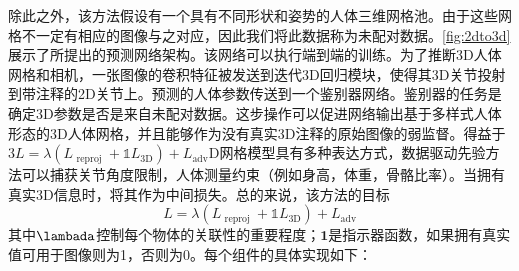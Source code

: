 除此之外，该方法假设有一个具有不同形状和姿势的人体三维网格池。由于这些网格不一定有相应的图像与之对应，因此我们将此数据称为未配对数据。\cref{fig:2dto3d}展示了所提出的预测网络架构。该网络可以执行端到端的训练。为了推断3D人体网格和相机，一张图像的卷积特征被发送到迭代3D回归模块，使得其3D关节投射到带注释的2D关节上。预测的人体参数传送到一个鉴别器网络。鉴别器的任务是确定3D参数是否是来自未配对数据。这步操作可以促进网络输出基于多样式人体形态的3D人体网格，并且能够作为没有真实3D注释的原始图像的弱监督。得益于3$L=\lambda\left(L_{\text { reproj }}+\mathbb{1} L_{3 \mathrm{D}}\right)+L_{\mathrm{adv}}$D网格模型具有多种表达方式，数据驱动先验方法可以捕获关节角度限制，人体测量约束（例如身高，体重，骨骼比率）。当拥有真实3D信息时，将其作为中间损失。总的来说，该方法的目标
\begin{equation}
	L=\lambda\left(L_{\text { reproj }}+\mathbb{1} L_{3 \mathrm{D}}\right)+L_{\mathrm{adv}}
\end{equation}其中$\lambada$控制每个物体的关联性的重要程度；$\mathbf{1}$是指示器函数，如果拥有真实值可用于图像则为1，否则为0。每个组件的具体实现如下：
